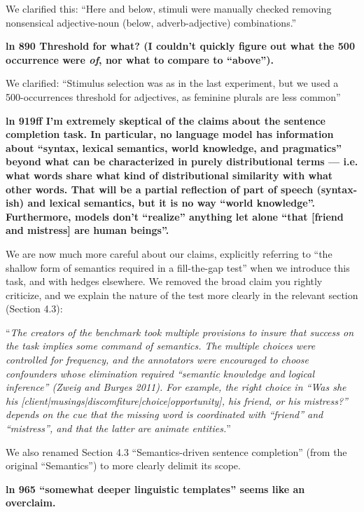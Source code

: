 \documentclass{article}
\begin{document}
We clarified this: ``Here and below, stimuli were manually checked removing nonsensical adjective-noun (below, adverb-adjective) combinations.''
\newline

\textbf{ln 890 Threshold for what? (I couldn't quickly figure out what the 500 occurrence were \emph{of}, nor what to compare to ``above'').}

We clarified: ``Stimulus selection was as in the last experiment, but we used a 500-occurrences threshold for adjectives, as feminine plurals are less common''
\newline

\textbf{ln 919ff I'm extremely skeptical of the claims about the sentence completion task. In particular, no language model has information about ``syntax, lexical semantics, world knowledge, and pragmatics'' beyond what can be characterized in purely distributional terms --- i.e. what words share what kind of distributional similarity with what other words. That will be a partial reflection of part of speech (syntax-ish) and lexical semantics, but it is no way ``world knowledge''. Furthermore, models don't ``realize'' anything let alone ``that [friend and mistress] are human beings''.}

We are now much more careful about our claims, explicitly referring to ``the shallow form of semantics required in a fill-the-gap test'' when we introduce this task, and with hedges elsewhere. We removed the broad claim you rightly criticize, and we explain the nature of the test more clearly in the relevant section (Section 4.3):

``\textit{The creators of the benchmark took multiple provisions to insure that success on the task implies some command of semantics. The multiple choices were controlled for frequency, and the annotators were encouraged to choose confounders whose elimination required ``semantic knowledge and logical inference'' (Zweig and Burges 2011).  For example, the right choice in ``Was she his [client|musings|discomfiture|choice|opportunity], his friend, or his mistress?'' depends on the cue that the missing word is coordinated with ``friend'' and ``mistress'', and that the latter are animate entities.}''

We also renamed Section 4.3 ``Semantics-driven sentence completion'' (from the original ``Semantics'') to more clearly delimit its scope.
\newline

\textbf{ln 965 ``somewhat deeper linguistic templates'' seems like an overclaim.}
\end{document}
